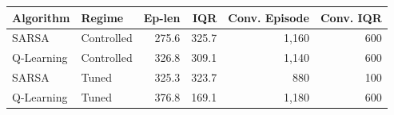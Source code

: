 \begin{tabular}{llrrrr}
\hline
\textbf{Algorithm} & \textbf{Regime} & \textbf{Ep-len} & \textbf{IQR} & \textbf{Conv. Episode} & \textbf{Conv. IQR} \\
\hline
SARSA & Controlled & 275.6 & 325.7 & 1,160 & 600 \\
Q-Learning & Controlled & 326.8 & 309.1 & 1,140 & 600 \\
\hline
SARSA & Tuned & 325.3 & 323.7 & 880 & 100 \\
Q-Learning & Tuned & 376.8 & 169.1 & 1,180 & 600 \\
\hline
\end{tabular}
